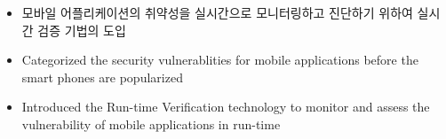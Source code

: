 \documentclass[english,representative]{resume_structure}
\begin{document}
\begin{Work}
{{\begin{itemize}
      \item 모바일 어플리케이션의 취약성을 실시간으로 모니터링하고 진단하기 위하여 실시간 검증 기법의 도입
    \end{itemize}
    }
    {
    \begin{itemize}
      \item Categorized the security vulnerablities for mobile applications before the smart phones are popularized 
      \item Introduced the Run-time Verification technology to monitor and assess the vulnerability of mobile applications in run-time
    \end{itemize}
    }
}
\end{Work}

\end{document}
